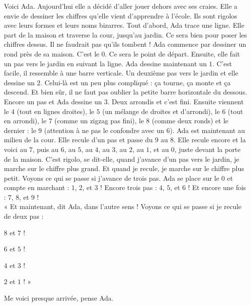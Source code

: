 Voici Ada. Aujourd'hui elle a décidé d'aller jouer dehors avec ses craies. 
Elle a envie de dessiner les chiffres qu'elle vient d'apprendre à l'école. Ils sont rigolos avec leurs formes et leurs noms bizarres.
Tout d'abord, Ada trace une ligne. Elle part de la maison et traverse la cour, jusqu'au jardin. 
Ce sera bien pour poser les chiffres dessus. Il ne faudrait pas qu'ils tombent ! 
Ada commence par dessiner un rond près de sa maison. C'est le $0$. Ce sera le point de départ. 
Ensuite, elle fait un pas vers le jardin en suivant la ligne. Ada dessine maintenant un $1$. C'est facile, il ressemble à une barre verticale. 
Un deuxième pas vers le jardin et elle dessine un $2$. Celui-là est un peu plus compliqué : ça tourne, ça monte et ça descend. Et bien sûr, il ne faut pas oublier la petite barre horizontale du dessous.
Encore un pas et Ada dessine un $3$. Deux arrondis et c'est fini.
Ensuite viennent le $4$ (tout en lignes droites), le $5$ (un mélange de droites et d'arrondi), le $6$ (tout en arrondi), le $7$ (comme un zigzag pas fini), le $8$ (comme deux ronds) et le dernier : le $9$ (attention à ne pas le confondre avec un $6$). 
Ada est maintenant au milieu de la cour. Elle recule d'un pas et passe du $9$ au $8$. Elle recule encore et la voici au $7$, puis au $6$, au $5$, au $4$, au $3$, au $2$, au $1$, et au $0$, juste devant la porte de la maison. 
C'est rigolo, se dit-elle, quand j'avance d'un pas vers le jardin, je marche sur le chiffre plus grand. Et quand je recule, je marche sur le chiffre plus petit. 
Voyons ce qui se passe si j'avance de trois pas. Ada se place sur le $0$ et compte en marchant : $1$, $2$, et $3$ ! Encore trois pas : $4$, $5$, et $6$ ! Et encore une fois : $7$, $8$, et $9$ ! \\
« Et maintenant, dit Ada, dans l'autre sens ! Voyons ce qui se passe si je recule de deux pas : 
\begin{description}
    \item $8$ et $7$ ! 
    \item $6$ et $5$ ! 
    \item $4$ et $3$ ! 
    \item $2$ et $1$ ! »
\end{description} 
Me voici presque arrivée, pense Ada.

%    

